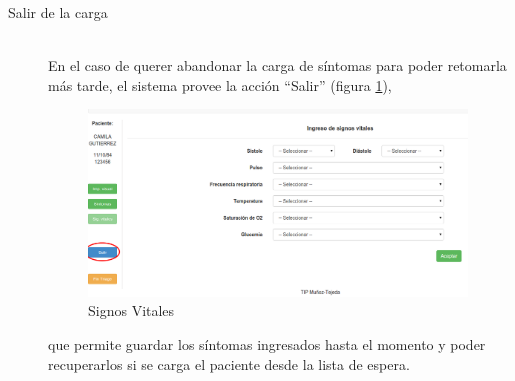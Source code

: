 \begin{description}
\item[Salir de la carga]\mbox{} \\
En el caso de querer abandonar la carga de síntomas para poder retomarla más tarde, el sistema provee la acción ``Salir'' (figura \ref{fig:fin}),
\begin{figure}
\centerline{\includegraphics[width=0.99\textwidth]{fin.png}}
\caption{Signos Vitales} \label{fig:fin}
\end{figure}
que permite guardar los síntomas ingresados hasta el momento y poder recuperarlos si se carga el paciente desde la lista de espera.


\end{description}